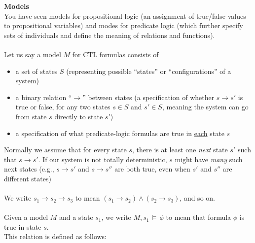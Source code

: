 \documentclass[12pt,letterpaper,boxed,cm]{hmcpset}
\newcommand{\ra}[0]{\rightarrow}
\newcommand{\turn}[0]{\,\vDash\,}
\begin{document}
\textbf{Models}\\
You have seen models for propositional logic (an assignment of true/false values to propositional variables) and modes for predicate logic (which further specify sets of individuals and define the meaning of relations and functions).\\\\
Let us say a model $M$ for CTL formulas consists of
\begin{itemize}
    \item a set of states $S$ (representing possible ``states'' or ``configurations'' of a system)
    \item a binary relation ``$\ra$'' between states (a specification of whether $s \ra s'$ is true or false, for any two states $s\in S$ and $s'\in S$, meaning the system can go from state $s$ directly to state $s'$)
    \item a specification of what predicate-logic formulas are true in \ul{each} state $s$
\end{itemize}
Normally we assume that for every state $s$, there is at least one \emph{next} state $s'$ such that $s \ra s'$. If our system is not totally deterministic, $s$ might have \emph{many} such next states (e.g., $s \ra s'$ and $s\ra s''$ are both true, even when $s'$ and $s''$ are different states)\\\\
We write $s_1 \ra s_2 \ra s_3$  to mean $(s_1 \ra s_2) \land (s_2 \ra s_3)$, and so on.\\\\
Given a model $M$ and a state $s_1$, we write $M,s_1 \turn \phi$  to mean that formula $\phi$ is true in state $s$.\\
This relation is defined as follows:
\end{document}
